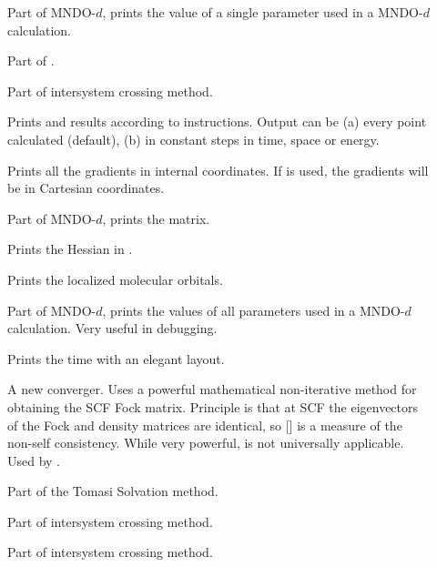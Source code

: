\begin{description}
\item[] Part of MNDO-$d$,  prints the value of a
single parameter used in a MNDO-$d$ calculation. 

\item[] Part of .

\item[] Part of intersystem crossing method.

\item[] Prints  and  results  according to
instructions. Output can be (a) every point calculated (default), (b) in
constant steps in time, space or energy.

\item[] Prints all the gradients in internal coordinates. If
 is used, the gradients will be in Cartesian coordinates.

\item[] Part of MNDO-$d$,  prints the 
matrix.

\item[] Prints the Hessian in .

\item[] Prints the localized molecular orbitals.

\item[] Part of MNDO-$d$,  prints the values of all
parameters used in a MNDO-$d$ calculation.  Very useful in debugging.

\item[] Prints the time with an elegant layout.

\item[] A new converger. Uses a powerful  mathematical
non-iterative method for obtaining the SCF Fock  matrix. Principle is that at
SCF the eigenvectors of the Fock  and density matrices are identical, so
[] is a measure of the non-self consistency. While very powerful,
 is not  universally applicable. Used by .

\item[] Part of the Tomasi Solvation method.

\item[] Part of intersystem crossing method.

\item[] Part of intersystem crossing method.


\end{description}
